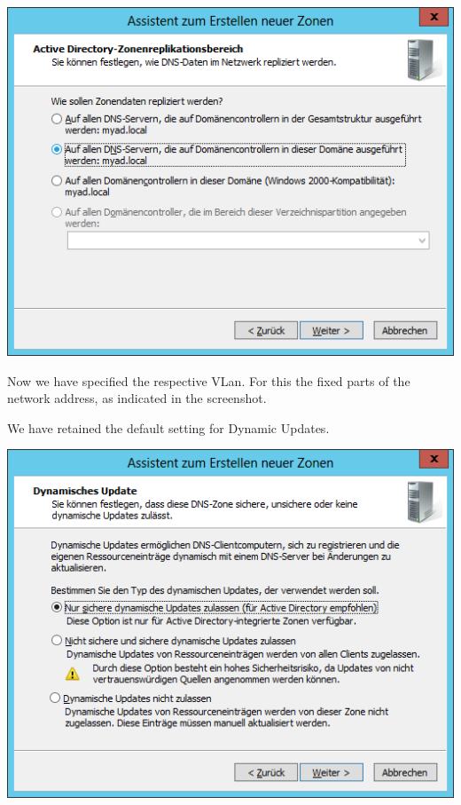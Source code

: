 \begin{minipage}[X]{0.8\textwidth} 
\centering 
\includegraphics [scale=0.6]{graphics/4.png}
\label{ecoconcept} 
\end{minipage} \newline



Now we have specified the respective VLan. For this the fixed parts of the network address, as indicated in the screenshot.



We have retained the default setting for Dynamic Updates.\newline


\begin{minipage}[X]{0.8\textwidth} 
	\centering 
	\includegraphics [scale=0.6]{graphics/5.png}
	\label{ecoconcept} 
\end{minipage} \newline

